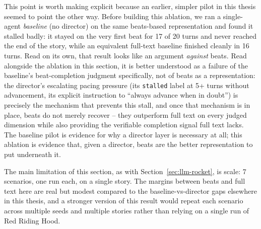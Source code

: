 \documentclass[10pt]{article}
\begin{document}
This point is worth making explicit because an earlier, simpler pilot in this thesis seemed to point the other way. Before building this ablation, we ran a single-agent \emph{baseline} (no director) on the same beats-based representation and found it stalled badly: it stayed on the very first beat for 17 of 20 turns and never reached the end of the story, while an equivalent full-text baseline finished cleanly in 16 turns. Read on its own, that result looks like an argument \emph{against} beats. Read alongside the ablation in this section, it is better understood as a failure of the baseline's beat-completion judgment specifically, not of beats as a representation: the director's escalating pacing pressure (its \texttt{stalled} label at 5+ turns without advancement, its explicit instruction to ``always advance when in doubt'') is precisely the mechanism that prevents this stall, and once that mechanism is in place, beats do not merely recover -- they outperform full text on every judged dimension while also providing the verifiable completion signal full text lacks. The baseline pilot is evidence for why a director layer is necessary at all; this ablation is evidence that, given a director, beats are the better representation to put underneath it.

The main limitation of this section, as with Section~\ref{sec:llm-rocket}, is scale: 7 scenarios, one run each, on a single story. The margins between beats and full text here are real but modest compared to the baseline-vs-director gaps elsewhere in this thesis, and a stronger version of this result would repeat each scenario across multiple seeds and multiple stories rather than relying on a single run of Red Riding Hood.
\end{document}
